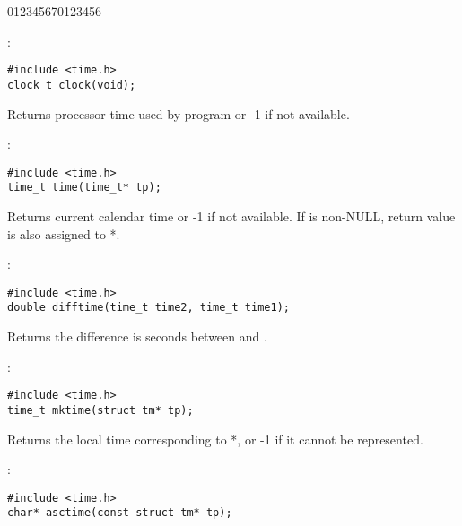 \begin{Ventry2}{012345670123456}

\item[clock]
\label{item:clock}
:
\begin{production}
\begin{verbatim}
#include <time.h>
clock_t clock(void);
\end{verbatim}
\end{production}

     Returns processor time used by program or -1 if not available.
\item[time]
\label{item:time}
:
\begin{production}
\begin{verbatim}
#include <time.h>
time_t time(time_t* tp);
\end{verbatim}
\end{production}

     Returns current calendar time or -1 if not available. If  is non-NULL,
     return value is also assigned to *.
\item[difftime]
\label{item:difftime}
:
\begin{production}
\begin{verbatim}
#include <time.h>
double difftime(time_t time2, time_t time1);
\end{verbatim}
\end{production}

     Returns the difference is seconds between  and .
\item[mktime]
\label{item:mktime}
:
\begin{production}
\begin{verbatim}
#include <time.h>
time_t mktime(struct tm* tp);
\end{verbatim}
\end{production}

     Returns the local time corresponding to *, or -1 if it cannot be
     represented.

\item[asctime]
\label{item:asctime}
:
\begin{production}
\begin{verbatim}
#include <time.h>
char* asctime(const struct tm* tp);
\end{verbatim}
\end{production}


\end{Ventry2}
